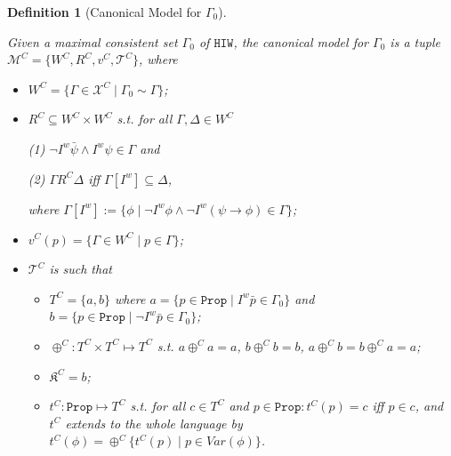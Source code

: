 \documentclass{article}
\newtheorem{defi}{Definition}
\begin{document}
\begin{defi}[Canonical Model for $\Gamma_{0}$]
\label{canmodIW}

Given a maximal consistent set $\Gamma_{0}$ of $\texttt{HIW}$, the canonical model for $\Gamma_{0}$ is a tuple $\mathcal{M}^{C} = \{W^{C}, R^{C}, v^{C}, \mathcal{T}^{C}\}$, where 

\begin{itemize}

\item $W^{C} = \{ \Gamma \in \mathcal{X}^{C} \mid \Gamma_{0} \sim \Gamma\}$;

\item $R^{C} \subseteq W^{C} \times W^{C}$ s.t. for all $\Gamma, \Delta \in W^{C}$

\begin{center}

(1) $\neg I^{w} \bar{\psi} \wedge I^{w} \psi \in \Gamma$ and

(2) $\Gamma R^{C} \Delta$ iff $\Gamma[I^{w}] \subseteq \Delta$,

where $\Gamma[I^{w}] := \{\phi \mid \neg I^{w} \phi \wedge \neg I^{w} (\psi \rightarrow \phi) \in \Gamma\}$;

\end{center}


\item $v^{C}(p) = \{\Gamma \in W^{C} \mid p \in \Gamma\}$;

\item $\mathcal{T}^{C}$ is such that

\begin{itemize}

\item $T^{C}= \{a, b\}$ where $a = \{p \in \mathtt{Prop} \mid I^{w} \bar{p} \in \Gamma_{0}\}$ and $b = \{ p \in \mathtt{Prop} \mid \neg I^{w} \bar{p} \in \Gamma_{0}\}$;

\item $\oplus^{C} : T^{C} \times T^{C} \mapsto T^{C}$ s.t. $a \oplus^{C} a = a$, $b \oplus^{C} b = b$, $a \oplus^{C} b = b \oplus^{C} a = a$;

\item $\mathfrak{K}^{C} = b$;

\item $t^{C}: \mathtt{Prop} \mapsto T^{C}$ s.t. for all $c \in T^{C}$ and $p \in \mathtt{Prop} : t^{C}(p) = c$ iff $p \in c$, and $t^{C}$ extends to the whole language by $t^{C}(\phi) = \oplus^{C}\{t^{C}(p) \mid p \in Var(\phi)\}$.

\end{itemize}

\end{itemize}

\end{defi}
\end{document}
